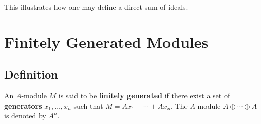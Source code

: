 \documentclass[11pt]{article}
\begin{document}
This illustrates how one may define a direct sum of ideals.


\section{Finitely Generated Modules}


\subsection{Definition}

An $A$-module $M$ is said to be \textbf{finitely generated} if there exist a set of \textbf{generators} $x_{1}, \ldots, x_{n}$ such that $M = Ax_{1} + \cdots + Ax_{n}$. The $A$-module $A \oplus \cdots \oplus A$ is denoted by $A^{n}$.
\end{document}
